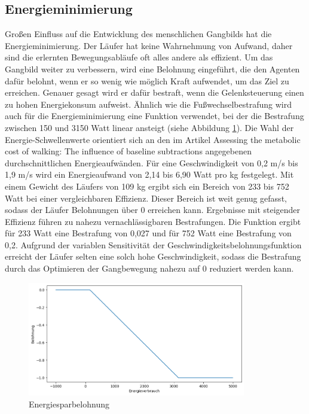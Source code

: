 \newpage
\subsection{Energieminimierung}
Großen Einfluss auf die Entwicklung des menschlichen Gangbilds hat die Energieminimierung. Der Läufer hat keine Wahrnehmung von Aufwand, daher sind die erlernten Bewegungsabläufe oft alles andere als effizient. Um das Gangbild weiter zu verbessern, wird eine Belohnung eingeführt, die den Agenten dafür belohnt, wenn er so wenig wie möglich Kraft aufwendet, um das Ziel zu erreichen. Genauer gesagt wird er dafür bestraft, wenn die Gelenksteuerung einen zu hohen Energiekonsum aufweist. Ähnlich wie die Fußwechselbestrafung wird auch für die Energieminimierung eine Funktion verwendet, bei der die Bestrafung zwischen 150 und 3150 Watt linear ansteigt (siehe Abbildung \ref{fig:plot_energiespar}). Die Wahl der Energie-Schwellenwerte orientiert sich an den im Artikel \grqq{}Assessing the metabolic cost of walking: The influence of baseline subtractions\grqq{} angegebenen durchschnittlichen Energieaufwänden.\cite{5333126}  Für eine Geschwindigkeit von 0,2 m/s bis 1,9 m/s wird ein Energieaufwand von 2,14 bis 6,90 Watt pro kg festgelegt. Mit einem Gewicht des Läufers von 109 kg ergibt sich ein Bereich von 233 bis 752 Watt bei einer vergleichbaren Effizienz. Dieser Bereich ist weit genug gefasst, sodass der Läufer Belohnungen über 0 erreichen kann. Ergebnisse mit steigender Effizienz führen zu nahezu vernachlässigbaren Bestrafungen. Die Funktion ergibt für 233 Watt eine Bestrafung von 0,027 und für 752 Watt eine Bestrafung von 0,2. Aufgrund der variablen Sensitivität der Geschwindigkeitsbelohnungsfunktion erreicht der Läufer selten eine solch hohe Geschwindigkeit, sodass die Bestrafung durch das Optimieren der Gangbewegung nahezu auf 0 reduziert werden kann.

\begin{figure}[H]
  \centering
  \includegraphics[width=0.85\textwidth]{img/plot_energiespar} 
  \caption{Energiesparbelohnung}
  \label{fig:plot_energiespar}
\end{figure}

